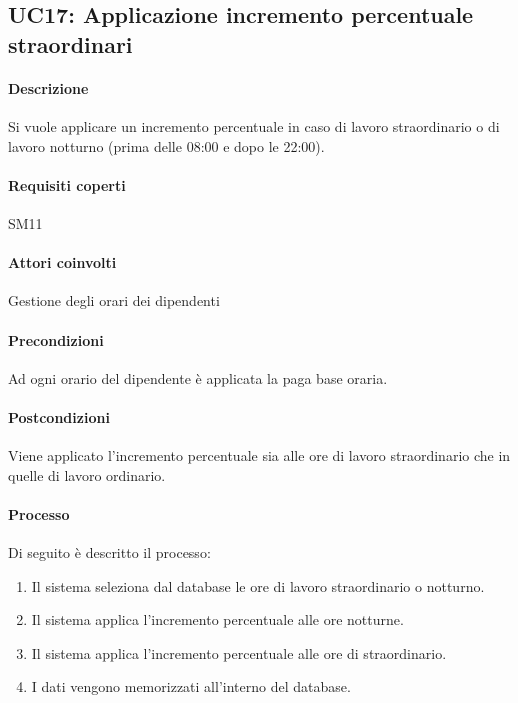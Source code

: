 \subsection{UC17: Applicazione incremento percentuale straordinari}
\paragraph{Descrizione}
Si vuole applicare un incremento percentuale in caso di lavoro straordinario o di lavoro notturno (prima delle 08:00 e dopo le 22:00).
\paragraph{Requisiti coperti}
SM11
\paragraph{Attori coinvolti}
Gestione degli orari dei dipendenti
\paragraph{Precondizioni}
Ad ogni orario del dipendente è applicata la paga base oraria.
\paragraph{Postcondizioni}
Viene applicato l'incremento percentuale sia alle ore di lavoro straordinario che in quelle di lavoro ordinario.
\paragraph{Processo}
Di seguito è descritto il processo:
\begin{enumerate}
	\item Il sistema seleziona dal database le ore di lavoro straordinario o notturno.
	\item Il sistema applica l'incremento percentuale alle ore notturne.
	\item Il sistema applica l'incremento percentuale alle ore di straordinario.
	\item I dati vengono memorizzati all'interno del database.
\end{enumerate}

